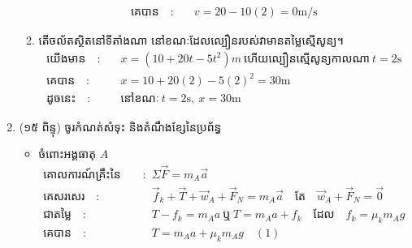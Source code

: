 \documentclass{classes/exam}
\begin{document}
\begin{enumerate}[I]
\begin{enumerate}[k]
\begin{align*}
				\text{គេបាន}\quad :&\quad v=20-10\left(2\right)=0\si{\metre/\second}
			\end{align*}
		\item តើចល័តស្ថិតនៅទីតាំងណា នៅខណៈដែលល្បឿនរបស់វាមានតម្លៃស្មើសូន្យ។
		\begin{align*}
			\text{យើងមាន}\quad :&\quad x=\left(10+20t-5t^{2}\right)m~\text{ហើយល្បឿនស្មើសូន្យកាលណា}~t=2\si{\second}\\
			\text{គេបាន}\quad :&\quad x=10+20\left(2\right)-5\left(2\right)^{2}=30\si{\metre}\\
			\text{ដូចនេះ}\quad :&\quad\text{នៅខណៈ}~t=2\si{\second},~ x=30\si{\metre}
		\end{align*}
	\end{enumerate}
	\item {\color{magenta}\ks (១៥ ពិន្ទុ)} ចូរកំណត់សំទុះ និងតំណឹងខ្សែនៃប្រព័ន្ធ
	\begin{figure}[H]
		\centering
	\end{figure}
	\begin{itemize}
		\item ចំពោះអង្គធាតុ $A$
			\begin{align*}
				\text{គោលការណ៍គ្រឹះនៃឌីណាមិច}\quad :&\quad \Sigma \vec{F}=m_{A}\vec{a}\\
				\text{គេសរសេរ}\quad :&\quad \overrightarrow{f}_{k}+\overrightarrow{T}+\overrightarrow{w}_{A}+\overrightarrow{F}_{N}=m_{A}\vec{a}\quad
				\text{តែ}\quad \overrightarrow{w}_{A}+\overrightarrow{F}_{N}=\vec{0}\\
				\text{ជាតម្លៃ}\quad :&\quad T-f_{k}=m_{A}a~\text{ឬ}~T=m_{A}a+f_{k}\quad
				\text{ដែល}\quad f_{k}=\mu_{k}m_{A}g\\
				\text{គេបាន}\quad :&\quad T=m_{A}a+\mu_{k}m_{A}g\quad (1)

\end{align*}
\end{itemize}
\end{enumerate}
\end{document}
